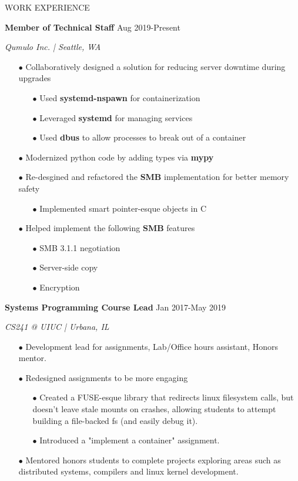 \documentclass[paper=a4,fontsize=10pt]{scrartcl} %
\newcommand{\sepspace}{\vspace*{1em}}		%
\newcommand{\NewPart}[1]{ \noindent \large \usefont{OT1}{phv}{b}{n}\uppercase{#1} \normalfont \normalsize}
\newcommand{\EducationEntry}[4]{
		\noindent \textbf{#1}     %
			\hfill#2 \par  %
		\noindent \textit{#3} \par        %
		\noindent\hangafter=0 \small #4 %
		\normalsize \par}
\begin{document}
\begin{minipage}[t]{0.75\textwidth}

\NewPart{Work experience}{}

\EducationEntry{Member of Technical Staff}{Aug 2019-Present}{Qumulo Inc. | Seattle, WA}{
\begin{itemize}
  \item[$\bullet$] Collaboratively designed a solution for reducing server downtime during upgrades
    \begin{itemize}
        \item[$\bullet$] Used \textbf{systemd-nspawn} for containerization
        \item[$\bullet$] Leveraged \textbf{systemd} for managing services
        \item[$\bullet$] Used \textbf{dbus} to allow processes to break out of a container
    \end{itemize}
  \item[$\bullet$] Modernized python code by adding types via \textbf{mypy}
  \item[$\bullet$] Re-desgined and refactored the \textbf{SMB} implementation for better memory safety
    \begin{itemize}
      \item[$\bullet$] Implemented smart pointer-esque objects in C
    \end{itemize}
  \item[$\bullet$] Helped implement the following \textbf{SMB} features
    \begin{itemize}
      \item[$\bullet$] SMB 3.1.1 negotiation
      \item[$\bullet$] Server-side copy
      \item[$\bullet$] Encryption
    \end{itemize}
\end{itemize}
}
\sepspace

\EducationEntry{Systems Programming Course Lead}{Jan 2017-May 2019}{CS241 @ UIUC | Urbana, IL}{
\begin{itemize}
  \item[$\bullet$] Development lead for assignments, Lab/Office hours assistant, Honors mentor.
  \item[$\bullet$] Redesigned assignments to be more engaging
    \begin{itemize}
        \item[$\bullet$] Created a FUSE-esque library that redirects linux filesystem calls, but doesn't leave stale mounts on crashes, allowing students to attempt building a file-backed fs (and easily debug it).
      \item[$\bullet$] Introduced a "implement a container" assignment.
    \end{itemize}
  \item[$\bullet$] Mentored honors students to complete projects exploring areas such as distributed systems, compilers and linux kernel development.
\end{itemize}
}
\sepspace


\end{minipage}
\end{document}
